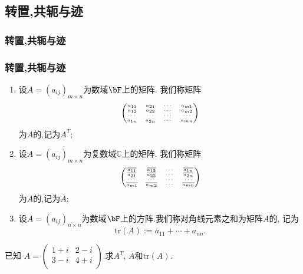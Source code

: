 \subsection{转置,共轭与迹}

\subsubsection{转置,共轭与迹}
\begin{frame}\frametitle{转置,共轭与迹}
\begin{definition}
\begin{enumerate}
\item 设$A=(a_{ij})_{m\times n}$为数域$\bF$上的矩阵. 我们称矩阵
\[\tiny \begin{pmatrix} a_{11}& a_{21}&\cdots&a_{m1}\\a_{12}& a_{22}&\cdots&a_{m2}\\\cdots&\cdots&\cdots&\cdots\\a_{1n}& a_{2n}&\cdots&a_{mn}\\
\end{pmatrix}\]
为$A$的,记为$A^T$;
\pp
\item 设$A=(a_{ij})_{m\times n}$为复数域$\mathbb C$上的矩阵. 我们称矩阵
\[\tiny \begin{pmatrix}
\overline{a_{11}}&\overline{a_{12}}&\cdots&\overline{a_{1n}}\\
\overline{a_{21}}&\overline{a_{22}}&\cdots&\overline{a_{2n}}\\
\cdots&\cdots&\cdots&\cdots\\
\overline{a_{m1}}&\overline{a_{m2}}&\cdots&\overline{a_{mn}}\\
\end{pmatrix}\]
为$A$的,记为$\overline{A}$;
\pp
\item 设$A=(a_{ij})_{n\times n}$为数域$\bF$上的方阵.我们称对角线元素之和为矩阵$A$的, 记为
\[\mathrm{tr}(A):=a_{11}+\cdots+a_{nn}.\]
\end{enumerate}
\end{definition}
\pp
\begin{example}
已知 $A=\begin{pmatrix}1+i&2-i\\3-i&4+i\\\end{pmatrix}$.求$A^T$, $\overline{A}$和$\mathrm{tr}(A)$.
\end{example}
\end{frame}





